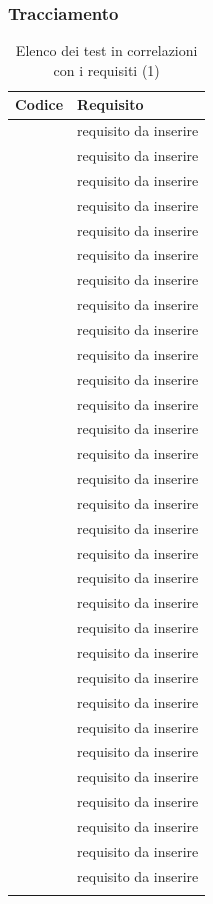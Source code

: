 \newpage

	\subsubsection{Tracciamento} \label{tracciamentovalidazione}
    
    \setcounter{tv}{0}
    
	\begin{table}[H]
		\centering
		{\def\arraystretch{1.4}
		\begin{tabularx}{\textwidth}{YY}
			\textbf{Codice} & \textbf{Requisito} \\
			\toprule
			\addtotv & requisito da inserire \\
			\addtotv & requisito da inserire \\
			\addtotv & requisito da inserire \\
			\addtotv & requisito da inserire \\
			\addtotv & requisito da inserire \\
			\addtotv & requisito da inserire \\
			\addtotv & requisito da inserire \\
			\addtotv & requisito da inserire \\
			\addtotv & requisito da inserire \\
			\addtotv & requisito da inserire \\
			\addtotv & requisito da inserire \\
			\addtotv & requisito da inserire \\
			\addtotv & requisito da inserire \\
			\addtotv & requisito da inserire \\
			\addtotv & requisito da inserire \\
			\addtotv & requisito da inserire \\
			\addtotv & requisito da inserire \\
			\addtotv & requisito da inserire \\
			\addtotv & requisito da inserire \\
			\addtotv & requisito da inserire \\
			\addtotv & requisito da inserire \\
			\addtotv & requisito da inserire \\
			\addtotv & requisito da inserire \\
			\addtotv & requisito da inserire \\
			\addtotv & requisito da inserire \\
			\addtotv & requisito da inserire \\
			\addtotv & requisito da inserire \\
			\addtotv & requisito da inserire \\
			\addtotv & requisito da inserire \\
			\addtotv & requisito da inserire \\
			\addtotv & requisito da inserire \\
            \bottomrule\\
            \end{tabularx}}
		\caption{Elenco dei test in correlazioni con i requisiti (1)}
	\end{table}

